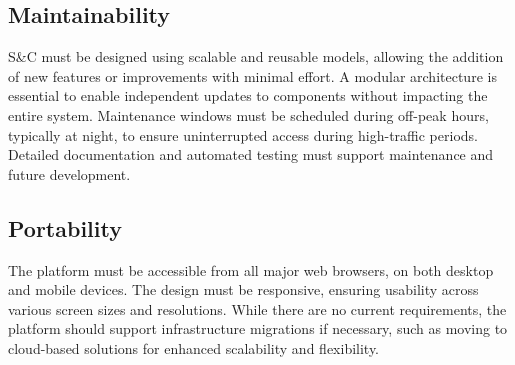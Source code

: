 \subsection{Maintainability}
S\&C must be designed using scalable and reusable models, allowing the addition of new features or improvements with minimal effort.
A modular architecture is essential to enable independent updates to components without impacting the entire system.
Maintenance windows must be scheduled during off-peak hours, typically at night, to ensure uninterrupted access during high-traffic periods.
Detailed documentation and automated testing must support maintenance and future development.

\subsection{Portability}
The platform must be accessible from all major web browsers, on both desktop and mobile devices.
The design must be responsive, ensuring usability across various screen sizes and resolutions.
While there are no current requirements, the platform should support infrastructure migrations if necessary, such as moving to cloud-based solutions for enhanced scalability and flexibility.
